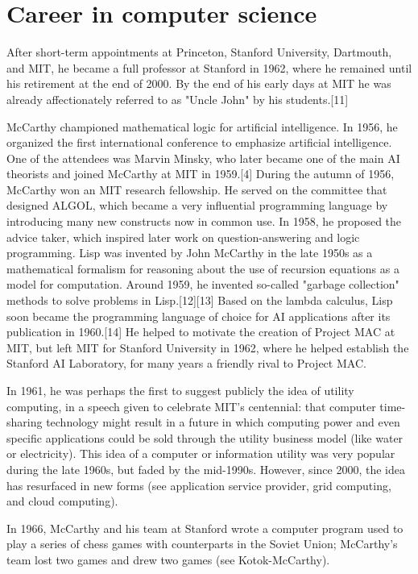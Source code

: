 \documentclass[pdftex, a4paper, 12pt]{article}
\begin{document}
\section{Career in computer science}

{\raggedright After short-term appointments at Princeton, Stanford University, Dartmouth, and MIT, he became a full professor at Stanford in 1962, where he remained until his retirement at the end of 2000. By the end of his early days at MIT he was already affectionately referred to as "Uncle John" by his students.[11]

McCarthy championed mathematical logic for artificial intelligence. In 1956, he organized the first international conference to emphasize artificial intelligence. One of the attendees was Marvin Minsky, who later became one of the main AI theorists and joined McCarthy at MIT in 1959.[4] During the autumn of 1956, McCarthy won an MIT research fellowship. He served on the committee that designed ALGOL, which became a very influential programming language by introducing many new constructs now in common use. In 1958, he proposed the advice taker, which inspired later work on question-answering and logic programming. Lisp was invented by John McCarthy in the late 1950s as a mathematical formalism for reasoning about the use of recursion equations as a model for computation. Around 1959, he invented so-called "garbage collection" methods to solve problems in Lisp.[12][13] Based on the lambda calculus, Lisp soon became the programming language of choice for AI applications after its publication in 1960.[14] He helped to motivate the creation of Project MAC at MIT, but left MIT for Stanford University in 1962, where he helped establish the Stanford AI Laboratory, for many years a friendly rival to Project MAC.

In 1961, he was perhaps the first to suggest publicly the idea of utility computing, in a speech given to celebrate MIT's centennial: that computer time-sharing technology might result in a future in which computing power and even specific applications could be sold through the utility business model (like water or electricity). This idea of a computer or information utility was very popular during the late 1960s, but faded by the mid-1990s. However, since 2000, the idea has resurfaced in new forms (see application service provider, grid computing, and cloud computing).

In 1966, McCarthy and his team at Stanford wrote a computer program used to play a series of chess games with counterparts in the Soviet Union; McCarthy's team lost two games and drew two games (see Kotok-McCarthy).

}
\end{document}
